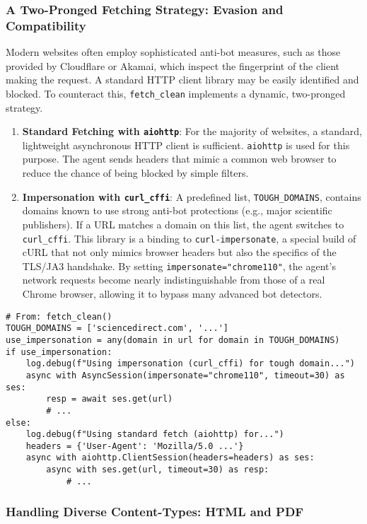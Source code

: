 \documentclass[12pt, a4paper]{article}
\begin{document}
\subsubsection{A Two-Pronged Fetching Strategy: Evasion and Compatibility}

Modern websites often employ sophisticated anti-bot measures, such as those provided by Cloudflare or Akamai, which inspect the fingerprint of the client making the request. A standard HTTP client library may be easily identified and blocked. To counteract this, \verb|fetch_clean| implements a dynamic, two-pronged strategy.
\begin{enumerate}
    \item \textbf{Standard Fetching with \texttt{aiohttp}}: For the majority of websites, a standard, lightweight asynchronous HTTP client is sufficient. \texttt{aiohttp} is used for this purpose. The agent sends headers that mimic a common web browser to reduce the chance of being blocked by simple filters.
    \item \textbf{Impersonation with \texttt{curl\_cffi}}: A predefined list, \texttt{TOUGH\_DOMAINS}, contains domains known to use strong anti-bot protections (e.g., major scientific publishers). If a URL matches a domain on this list, the agent switches to \texttt{curl\_cffi}. This library is a binding to \texttt{curl-impersonate}, a special build of cURL that not only mimics browser headers but also the specifics of the TLS/JA3 handshake. By setting \texttt{impersonate="chrome110"}, the agent's network requests become nearly indistinguishable from those of a real Chrome browser, allowing it to bypass many advanced bot detectors.
\end{enumerate}

\begin{lstlisting}[style=myPython]
# From: fetch_clean()
TOUGH_DOMAINS = ['sciencedirect.com', '...']
use_impersonation = any(domain in url for domain in TOUGH_DOMAINS)
if use_impersonation:
    log.debug(f"Using impersonation (curl_cffi) for tough domain...")
    async with AsyncSession(impersonate="chrome110", timeout=30) as ses:
        resp = await ses.get(url)
        # ...
else:
    log.debug(f"Using standard fetch (aiohttp) for...")
    headers = {'User-Agent': 'Mozilla/5.0 ...'}
    async with aiohttp.ClientSession(headers=headers) as ses:
        async with ses.get(url, timeout=30) as resp:
            # ...
\end{lstlisting}

\subsubsection{Handling Diverse Content-Types: HTML and PDF}
\end{document}
